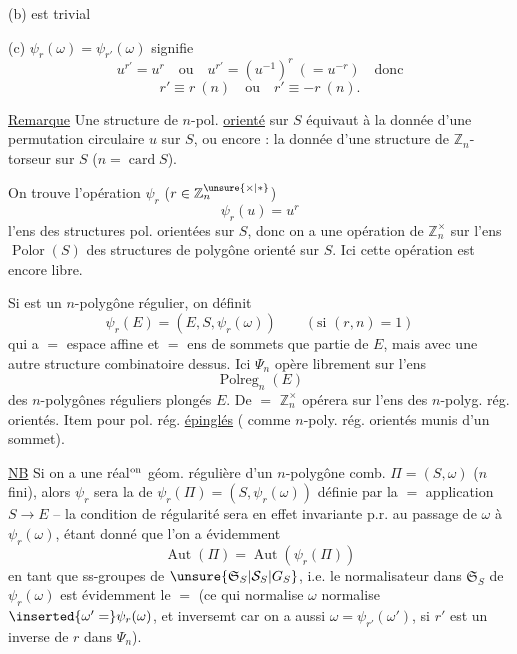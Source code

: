 (b) est trivial  

 (c) $\psi_r(\omega)=\psi_{r'}(\omega)$ signifie
\[
u^{r'}=u^r\quad\text{ou}\quad u^{r'}=(u^{-1})^r\ (=u^{-r})\quad\text{donc}
\]
\[
r'\equiv r\ (n)\quad\text{ou}\quad r'\equiv-r\ (n).
\]

\uline{Remarque} Une structure de $n$-pol. \uline{orienté} sur $S$ équivaut à la donnée d'une permutation circulaire $u$ sur $S$,
ou encore : la donnée d'une structure de $\mathbb Z_n$-torseur sur $S$ ($n=\operatorname{card}S$).

On trouve l'opération $\psi_r$ ($r\in\mathbb Z_n^{\unsure{\times|*}}$) 
\[
\psi_r(u)=u^r\tag*{(25)}
\]
 l'ens des structures pol. orientées sur $S$, donc on a une opération de $\mathbb Z_n^\times$ sur l'ens $\operatorname{Polor}(S)$ des structures de polygône orienté sur $S$. Ici cette opération est encore libre.

Si  est un $n$-polygône régulier, on définit 
\[
\psi_r(E)=(E,S,\psi_r(\omega))\qquad(\text{si }(r,n)=1)\tag*{(26)}
\]
qui a $=$ espace affine  et $=$ ens de sommets   que partie de $E$, mais avec une autre structure combinatoire dessus. Ici $\Psi_n$ opère librement sur l'ens
\[
\operatorname{Polreg}_n(E)
\]
des $n$-polygônes réguliers plongés  $E$. De $=$ $\mathbb Z_n^\times$ opérera  sur l'ens des $n$-polyg. rég. orientés. Item pour pol. rég. \uline{épinglés}
( comme $n$-poly. rég. orientés munis d'un sommet).  

\uline{NB} Si on a une  réal$^{\rm on}$ géom. régulière d'un $n$-polygône comb. $\Pi=(S,\omega)$ ($n$ fini), alors $\psi_r$ sera la  de $\psi_r(\Pi)=(S,\psi_r(\omega))$ définie par la $=$ application $S\longrightarrow E$ -- la condition de régularité sera en effet invariante p.r. au passage de $\omega$ à $\psi_r(\omega)$,  étant donné que  l'on a évidemment
\[
\operatorname{Aut}(\Pi)=\operatorname{Aut}(\psi_r(\Pi))\tag*{(27)}
\]
en tant que ss-groupes de $\unsure{\mathfrak S_S|\mathcal S_S|G_S}$, i.e. le normalisateur dans $\mathfrak S_S$ de   $\psi_r(\omega)$ est évidemment le $=$ (ce qui normalise $\omega$ normalise $\inserted{\omega'=}\psi_r(\omega)$, et inversemt car on a aussi $\omega=\psi_{r'}(\omega')$, si $r'$ est un inverse de $r$ dans $\Psi_n$).

